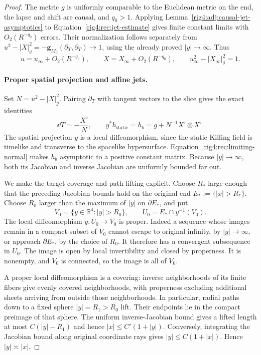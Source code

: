 \begin{proof}
The metric $g$ is uniformly comparable to the Euclidean metric on the end,
the lapse and shift are causal, and $q_0>1$.  Applying
Lemma~\ref{rig4:adj:causal-jet-asymptotics} to
Equation~\eqref{rig4:rec:jet-estimate} gives finite constant limits with
$O_2(R^{-q_0})$ errors.  Their normalization follows separately from
$u^2-|X|_g^2=-\mathbf g_{M_0}(\partial_T,\partial_T)\to1$,
using the already proved $|y|\to\infty$.  Thus
\begin{equation}
 u=u_\infty+O_2(R^{-q_0}),\qquad
 X=X_\infty+O_2(R^{-q_0}),\qquad
 u_\infty^2-|X_\infty|_\delta^2=1.
 \label{rig4:rec:limiting-normal}
\end{equation}

\paragraph{Proper spatial projection and affine jets.}
Set $N=u^2-|X|_g^2$.  Pairing $\partial_T$ with tangent vectors to the slice
gives the exact identities
\begin{equation}
 \dd T=-\frac{X^\flat}{N},\qquad
 y^*h_{\mathrm{static}}
   =h_b=g+N^{-1}X^\flat\otimes X^\flat.
 \label{rig4:rec:projection-identities}
\end{equation}
The spatial projection $y$ is a local diffeomorphism, since the static
Killing field is timelike and transverse to the spacelike hypersurface.
Equation~\eqref{rig4:rec:limiting-normal} makes $h_b$ asymptotic to a positive
constant matrix.  Because $|y|\to\infty$, both its Jacobian and inverse
Jacobian are uniformly bounded far out.

We make the target coverage and path lifting explicit.  Choose $R_*$ large
enough that the preceding Jacobian bounds hold on the original end
$E_*:=\{|x|>R_*\}$.  Choose $R_0$ larger than the maximum of $|y|$ on
$\partial E_*$, and put
\[
 V_0=\{y\in\mathbb R^4:|y|>R_0\},\qquad
 U_0=E_*\cap y^{-1}(V_0).
\]
The local diffeomorphism $y:U_0\to V_0$ is proper.  Indeed a sequence whose
images remain in a compact subset of $V_0$ cannot escape to original
infinity, by $|y|\to\infty$, or approach $\partial E_*$, by the choice of
$R_0$.  It therefore has a convergent subsequence in $U_0$.  The image is
open by local invertibility and closed by properness.  It is nonempty, and
$V_0$ is connected, so the image is all of $V_0$.

A proper local diffeomorphism is a covering: inverse neighborhoods of its
finite fibers give evenly covered neighborhoods, with properness excluding
additional sheets arriving from outside those neighborhoods.  In particular,
radial paths down to a fixed sphere $|y|=R_1>R_0$ lift.  Their endpoints lie
in the compact preimage of that sphere.  The uniform inverse-Jacobian bound
gives a lifted length at most $C(|y|-R_1)$ and hence
$|x|\leq C'(1+|y|)$.  Conversely, integrating the Jacobian bound along
original coordinate rays gives
$|y|\leq C(1+|x|)$.  Hence $|y|\asymp|x|$.


\end{proof}
